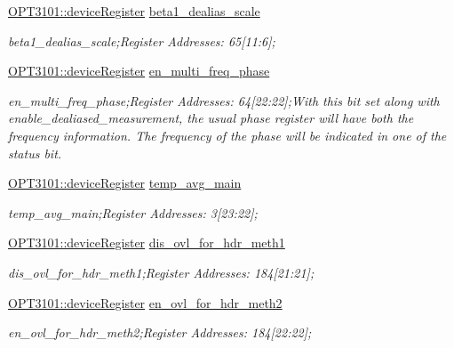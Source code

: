 \begin{DoxyCompactItemize}
\mbox{\hyperlink{class_o_p_t3101_1_1device_register}{O\+P\+T3101\+::device\+Register}} \mbox{\hyperlink{class_o_p_t3101_1_1registers_a6d9fd3f6940ec2d1bc40b6eb672ad333}{beta1\+\_\+dealias\+\_\+scale}}
\begin{DoxyCompactList}\small\item\em beta1\+\_\+dealias\+\_\+scale;Register Addresses\+: 65\mbox{[}11\+:6\mbox{]}; \end{DoxyCompactList}\item 
\mbox{\hyperlink{class_o_p_t3101_1_1device_register}{O\+P\+T3101\+::device\+Register}} \mbox{\hyperlink{class_o_p_t3101_1_1registers_a0d7d9f45b7942f6913a4a57e9481beaf}{en\+\_\+multi\+\_\+freq\+\_\+phase}}
\begin{DoxyCompactList}\small\item\em en\+\_\+multi\+\_\+freq\+\_\+phase;Register Addresses\+: 64\mbox{[}22\+:22\mbox{]};With this bit set along with enable\+\_\+dealiased\+\_\+measurement, the usual phase register will have both the frequency information. The frequency of the phase will be indicated in one of the status bit. \end{DoxyCompactList}\item 
\mbox{\hyperlink{class_o_p_t3101_1_1device_register}{O\+P\+T3101\+::device\+Register}} \mbox{\hyperlink{class_o_p_t3101_1_1registers_a111dc31dd6ec741a97786e5207b7bc7b}{temp\+\_\+avg\+\_\+main}}
\begin{DoxyCompactList}\small\item\em temp\+\_\+avg\+\_\+main;Register Addresses\+: 3\mbox{[}23\+:22\mbox{]}; \end{DoxyCompactList}\item 
\mbox{\hyperlink{class_o_p_t3101_1_1device_register}{O\+P\+T3101\+::device\+Register}} \mbox{\hyperlink{class_o_p_t3101_1_1registers_aadd456d05604771656442bf5f1ff0514}{dis\+\_\+ovl\+\_\+for\+\_\+hdr\+\_\+meth1}}
\begin{DoxyCompactList}\small\item\em dis\+\_\+ovl\+\_\+for\+\_\+hdr\+\_\+meth1;Register Addresses\+: 184\mbox{[}21\+:21\mbox{]}; \end{DoxyCompactList}\item 
\mbox{\hyperlink{class_o_p_t3101_1_1device_register}{O\+P\+T3101\+::device\+Register}} \mbox{\hyperlink{class_o_p_t3101_1_1registers_a3c076b5de6e72eff036b9371c91bfa3e}{en\+\_\+ovl\+\_\+for\+\_\+hdr\+\_\+meth2}}
\begin{DoxyCompactList}\small\item\em en\+\_\+ovl\+\_\+for\+\_\+hdr\+\_\+meth2;Register Addresses\+: 184\mbox{[}22\+:22\mbox{]}; \end{DoxyCompactList}\item 

\end{DoxyCompactItemize}
